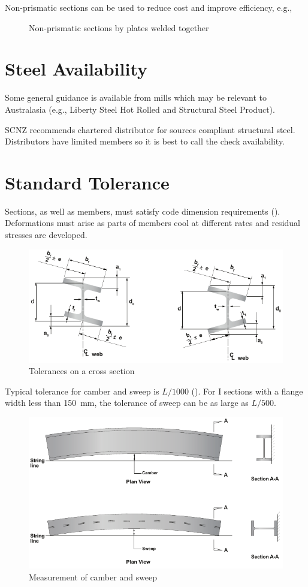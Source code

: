 Non-prismatic sections can be used to reduce cost and improve efficiency, e.g.,
\begin{figure}[H]
\centering
\caption{Non-prismatic sections by plates welded together}
\end{figure}
\section{Steel Availability}
Some general guidance is available from mills which may be relevant to Australasia (e.g., Liberty Steel Hot Rolled and Structural Steel Product).

SCNZ recommends chartered distributor for sources compliant structural steel. Distributors have limited members so it is best to call the check availability.
\section{Standard Tolerance}
Sections, as well as members, must satisfy code dimension requirements (). Deformations must arise as parts of members cool at different rates and residual stresses are developed.
\begin{figure}[H]
\centering
\includegraphics[width=14cm]{PIC/CH02/TOLERANCE}
\caption{Tolerances on a cross section}
\end{figure}

Typical tolerance for camber and sweep is $L/1000$ (). For I sections with a flange width less than \SI{150}{\mm}, the tolerance of sweep can be as large as $L/500$.
\begin{figure}[H]
\centering
\includegraphics[width=14cm]{PIC/CH02/CAMBER}
\caption{Measurement of camber and sweep}
\end{figure}
